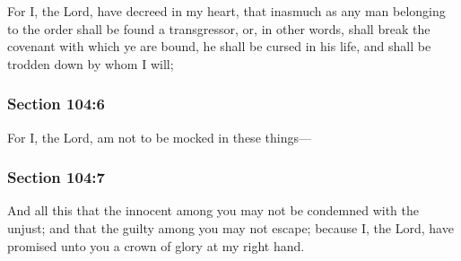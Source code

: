 		For I, the Lord, have decreed in my heart, that inasmuch as any man belonging to the order shall be found a transgressor, or, in other words, shall break the covenant with which ye are bound, he shall be cursed in his life, and shall be trodden down by whom I will;


	\subsubsection{Section 104:6} %
		\label{DC104-6}

		For I, the Lord, am not to be mocked in these things---


	\subsubsection{Section 104:7} %
		\label{DC104-7}

		And all this that the innocent among you may not be condemned with the unjust; and that the guilty among you may not escape; because I, the Lord, have promised unto you a crown of glory at my right hand.


